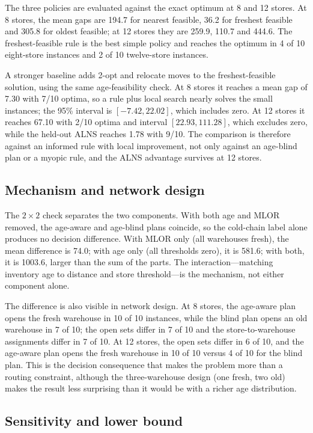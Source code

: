 \documentclass[preprint,12pt]{elsarticle}
\begin{document}
The three policies are evaluated against the exact optimum at 8 and 12 stores. At 8 stores, the mean gaps are 194.7 for nearest feasible, 36.2 for freshest feasible and 305.8 for oldest feasible; at 12 stores they are 259.9, 110.7 and 444.6. The freshest-feasible rule is the best simple policy and reaches the optimum in 4 of 10 eight-store instances and 2 of 10 twelve-store instances.

A stronger baseline adds 2-opt and relocate moves to the freshest-feasible solution, using the same age-feasibility check. At 8 stores it reaches a mean gap of 7.30 with 7/10 optima, so a rule plus local search nearly solves the small instances; the 95\% interval is $[-7.42,22.02]$, which includes zero. At 12 stores it reaches 67.10 with 2/10 optima and interval $[22.93,111.28]$, which excludes zero, while the held-out ALNS reaches 1.78 with 9/10. The comparison is therefore against an informed rule with local improvement, not only against an age-blind plan or a myopic rule, and the ALNS advantage survives at 12 stores.

\subsection{Mechanism and network design}

The $2\times2$ check separates the two components. With both age and MLOR removed, the age-aware and age-blind plans coincide, so the cold-chain label alone produces no decision difference. With MLOR only (all warehouses fresh), the mean difference is 74.0; with age only (all thresholds zero), it is 581.6; with both, it is 1003.6, larger than the sum of the parts. The interaction---matching inventory age to distance and store threshold---is the mechanism, not either component alone.

The difference is also visible in network design. At 8 stores, the age-aware plan opens the fresh warehouse in 10 of 10 instances, while the blind plan opens an old warehouse in 7 of 10; the open sets differ in 7 of 10 and the store-to-warehouse assignments differ in 7 of 10. At 12 stores, the open sets differ in 6 of 10, and the age-aware plan opens the fresh warehouse in 10 of 10 versus 4 of 10 for the blind plan. This is the decision consequence that makes the problem more than a routing constraint, although the three-warehouse design (one fresh, two old) makes the result less surprising than it would be with a richer age distribution.

\subsection{Sensitivity and lower bound}
\end{document}
